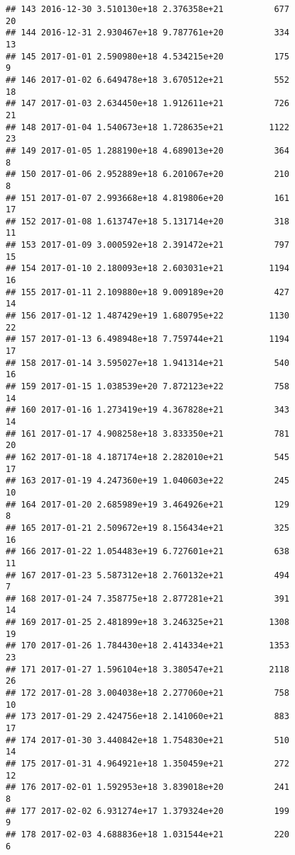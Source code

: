 \documentclass[]{article}
\begin{document}
\begin{verbatim}
## 143 2016-12-30 3.510130e+18 2.376358e+21          677              20
## 144 2016-12-31 2.930467e+18 9.787761e+20          334              13
## 145 2017-01-01 2.590980e+18 4.534215e+20          175               9
## 146 2017-01-02 6.649478e+18 3.670512e+21          552              18
## 147 2017-01-03 2.634450e+18 1.912611e+21          726              21
## 148 2017-01-04 1.540673e+18 1.728635e+21         1122              23
## 149 2017-01-05 1.288190e+18 4.689013e+20          364               8
## 150 2017-01-06 2.952889e+18 6.201067e+20          210               8
## 151 2017-01-07 2.993668e+18 4.819806e+20          161              17
## 152 2017-01-08 1.613747e+18 5.131714e+20          318              11
## 153 2017-01-09 3.000592e+18 2.391472e+21          797              15
## 154 2017-01-10 2.180093e+18 2.603031e+21         1194              16
## 155 2017-01-11 2.109880e+18 9.009189e+20          427              14
## 156 2017-01-12 1.487429e+19 1.680795e+22         1130              22
## 157 2017-01-13 6.498948e+18 7.759744e+21         1194              17
## 158 2017-01-14 3.595027e+18 1.941314e+21          540              16
## 159 2017-01-15 1.038539e+20 7.872123e+22          758              14
## 160 2017-01-16 1.273419e+19 4.367828e+21          343              14
## 161 2017-01-17 4.908258e+18 3.833350e+21          781              20
## 162 2017-01-18 4.187174e+18 2.282010e+21          545              17
## 163 2017-01-19 4.247360e+19 1.040603e+22          245              10
## 164 2017-01-20 2.685989e+19 3.464926e+21          129               8
## 165 2017-01-21 2.509672e+19 8.156434e+21          325              16
## 166 2017-01-22 1.054483e+19 6.727601e+21          638              11
## 167 2017-01-23 5.587312e+18 2.760132e+21          494               7
## 168 2017-01-24 7.358775e+18 2.877281e+21          391              14
## 169 2017-01-25 2.481899e+18 3.246325e+21         1308              19
## 170 2017-01-26 1.784430e+18 2.414334e+21         1353              23
## 171 2017-01-27 1.596104e+18 3.380547e+21         2118              26
## 172 2017-01-28 3.004038e+18 2.277060e+21          758              10
## 173 2017-01-29 2.424756e+18 2.141060e+21          883              17
## 174 2017-01-30 3.440842e+18 1.754830e+21          510              14
## 175 2017-01-31 4.964921e+18 1.350459e+21          272              12
## 176 2017-02-01 1.592953e+18 3.839018e+20          241               8
## 177 2017-02-02 6.931274e+17 1.379324e+20          199               9
## 178 2017-02-03 4.688836e+18 1.031544e+21          220               6

\end{verbatim}
\end{document}
